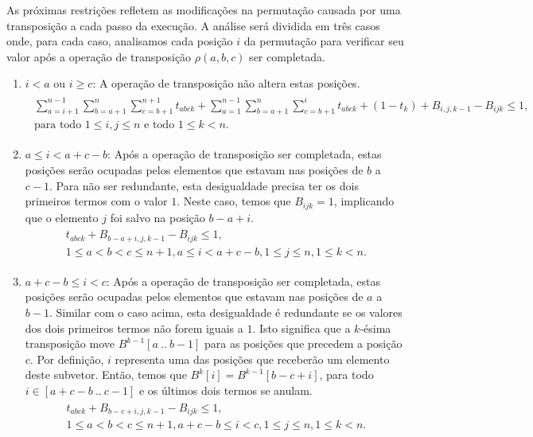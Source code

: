 As próximas restrições refletem as modificações na permutação causada
por uma transposição a cada passo da execução. A análise será dividida em
três casos onde, para cada caso, analisamos cada posição $i$ da
permutação para verificar seu valor após a operação de transposição
$\rho(a,b,c)$ ser completada.
\begin{enumerate}
\item{$i < a$ ou $i \ge c$:
A operação de transposição não altera estas posições.
\begin{align}
  \begin{split} 
    \sum_{a=i+1}^{n-1}\sum_{b=a+1}^{n}\sum_{c=b+1}^{n+1} t_{abck}
    + \sum_{a=1}^{n-1}\sum_{b=a+1}^{n}\sum_{c=b+1}^{i} t_{abck} + (1 -
    t_{k}) + B_{i,j,k-1} - B_{ijk} \le 1, \\
    \text{para todo $1 \le i, j \le n$ e todo $1 \le k <
    n$}.
  \end{split} \label{eq:transp3}
\end{align}}
\item{$a \le i < a + c -b$:
Após a operação de transposição ser completada, estas posições serão
ocupadas pelos elementos que estavam nas posições de $b$ a $c -
1$. Para não ser redundante, esta desigualdade precisa ter os dois
primeiros termos com o valor $1$. Neste caso, temos que
$B_{ijk} = 1$, implicando que o elemento $j$ foi salvo na
posição $b - a + i$.
\begin{align}
  \begin{split}
  t_{abck} + B_{b-a+i,j,k-1} - B_{ijk} \le 1, \\
  \text{$1 \le a < b < c \le n + 1, a \le i < a + c -b, 1 \le j
  \le n, 1 \le k < n$}.
  \end{split}
  \label{eq:transp4}
\end{align}}
\item{$a + c - b \le i < c$:
Após a operação de transposição ser completada, estas posições serão
ocupadas pelos elementos que estavam nas posições de $a$ a $b -
1$. Similar com o caso acima, esta desigualdade é redundante se os
valores dos dois primeiros termos não forem iguais a $1$. Isto
significa que a $k$-ésima transposição move $B^{k-1}[a~..~b-1]$ para
as posições que precedem a posição $c$. Por definição, $i$ representa
uma das posições que receberão um elemento deste subvetor. Então,
temos que $B^{k}[i] = B^{k-1}[b - c + i]$, para todo $i \in [a + c -
b~..~c - 1]$ e os últimos dois termos se anulam.
\begin{align}
  \begin{split}
  t_{abck} + B_{b-c+i,j,k-1} - B_{ijk} \le 1, \\
  \text{$1 \le a < b < c \le n + 1, a + c - b \le i < c, 1 \le j
  \le n, 1 \le k < n$}.  
  \end{split}
  \label{eq:transp5}
\end{align}}
\end{enumerate}

